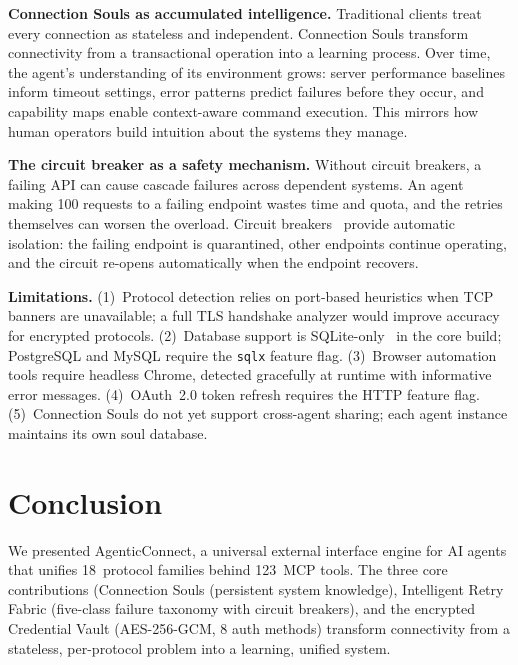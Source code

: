 \documentclass[10pt, twocolumn]{article}
\begin{document}
\textbf{Connection Souls as accumulated intelligence.} Traditional clients treat every connection as stateless and independent. Connection Souls transform connectivity from a transactional operation into a learning process. Over time, the agent's understanding of its environment grows: server performance baselines inform timeout settings, error patterns predict failures before they occur, and capability maps enable context-aware command execution. This mirrors how human operators build intuition about the systems they manage.

\textbf{The circuit breaker as a safety mechanism.} Without circuit breakers, a failing API can cause cascade failures across dependent systems. An agent making 100 requests to a failing endpoint wastes time and quota, and the retries themselves can worsen the overload. Circuit breakers~\cite{nygard2018release} provide automatic isolation: the failing endpoint is quarantined, other endpoints continue operating, and the circuit re-opens automatically when the endpoint recovers.

\textbf{Limitations.} (1)~Protocol detection relies on port-based heuristics when TCP banners are unavailable; a full TLS handshake analyzer would improve accuracy for encrypted protocols. (2)~Database support is SQLite-only~\cite{sqlite2024} in the core build; PostgreSQL and MySQL require the \texttt{sqlx} feature flag. (3)~Browser automation tools require headless Chrome, detected gracefully at runtime with informative error messages. (4)~OAuth~2.0 token refresh requires the HTTP feature flag. (5)~Connection Souls do not yet support cross-agent sharing; each agent instance maintains its own soul database.

\section{Conclusion}
\label{sec:conclusion}

We presented AgenticConnect, a universal external interface engine for AI agents that unifies 18~protocol families behind 123~MCP tools. The three core contributions (Connection Souls (persistent system knowledge), Intelligent Retry Fabric (five-class failure taxonomy with circuit breakers), and the encrypted Credential Vault (AES-256-GCM, 8 auth methods) transform connectivity from a stateless, per-protocol problem into a learning, unified system.
\end{document}
